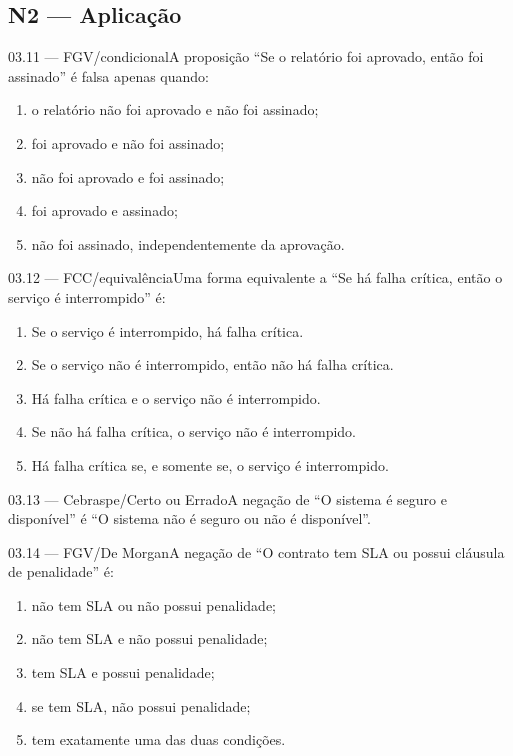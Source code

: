 \subsection*{N2 — Aplicação}
\begin{questao}{ 03.11 — FGV/condicional}A proposição ``Se o relatório foi aprovado, então foi assinado'' é falsa apenas quando:\begin{enumerate}[label=\Alph*)]\item o relatório não foi aprovado e não foi assinado;\item foi aprovado e não foi assinado;\item não foi aprovado e foi assinado;\item foi aprovado e assinado;\item não foi assinado, independentemente da aprovação.\end{enumerate}\end{questao}
\begin{questao}{ 03.12 — FCC/equivalência}Uma forma equivalente a ``Se há falha crítica, então o serviço é interrompido'' é:\begin{enumerate}[label=\Alph*)]\item Se o serviço é interrompido, há falha crítica.\item Se o serviço não é interrompido, então não há falha crítica.\item Há falha crítica e o serviço não é interrompido.\item Se não há falha crítica, o serviço não é interrompido.\item Há falha crítica se, e somente se, o serviço é interrompido.\end{enumerate}\end{questao}
\begin{questao}{ 03.13 — Cebraspe/Certo ou Errado}A negação de ``O sistema é seguro e disponível'' é ``O sistema não é seguro ou não é disponível''.\end{questao}
\begin{questao}{ 03.14 — FGV/De Morgan}A negação de ``O contrato tem SLA ou possui cláusula de penalidade'' é:\begin{enumerate}[label=\Alph*)]\item não tem SLA ou não possui penalidade;\item não tem SLA e não possui penalidade;\item tem SLA e possui penalidade;\item se tem SLA, não possui penalidade;\item tem exatamente uma das duas condições.\end{enumerate}\end{questao}
